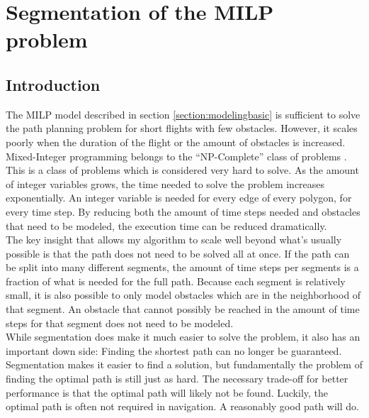 \section{Segmentation of the MILP problem}
\label{section:segment}


\subsection{Introduction}
The MILP model described in section \ref{section:modelingbasic} is sufficient to solve the path planning problem for short flights with few obstacles. However, it scales poorly when the duration of the flight or the amount of obstacles is increased. Mixed-Integer programming belongs to the ``NP-Complete'' class of problems \cite{DBLP:conf/coco/Karp72}. This is a class of problems which is considered very hard to solve. As the amount of integer variables grows, the time needed to solve the problem increases exponentially. An integer variable is needed for every edge of every polygon, for every time step. By reducing both the amount of time steps needed and obstacles that need to be modeled, the execution time can be reduced dramatically. \\
The key insight that allows my algorithm to scale well beyond what's usually possible is that the path does not need to be solved all at once. If the path can be split into many different segments, the amount of time steps per segments is a fraction of what is needed for the full path. Because each segment is relatively small, it is also possible to only model obstacles which are in the neighborhood of that segment. An obstacle that cannot possibly be reached in the amount of time steps for that segment does not need to be modeled. \\
While segmentation does make it much easier to solve the problem, it also has an important down side: Finding the shortest path can no longer be guaranteed. Segmentation makes it easier to find a solution, but fundamentally the problem of finding the optimal path is still just as hard. The necessary trade-off for better performance is that the optimal path will likely not be found. Luckily, the optimal path is often not required in navigation. A reasonably good path will do.

